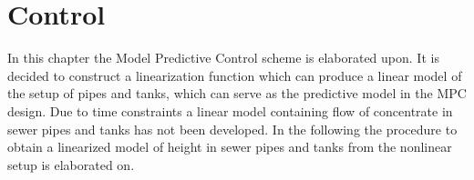 \chapter{Control}\label{ch:control}

In this chapter the Model Predictive Control scheme is elaborated upon. %
It is decided to construct a linearization function which can produce a linear model of the setup of pipes and tanks, which can serve as the predictive model in the MPC design.  
Due to time constraints a linear model containing flow of concentrate in sewer pipes and tanks has not been developed. 
In the following the procedure to obtain a linearized model of height in sewer pipes and tanks from the nonlinear setup is elaborated on.



